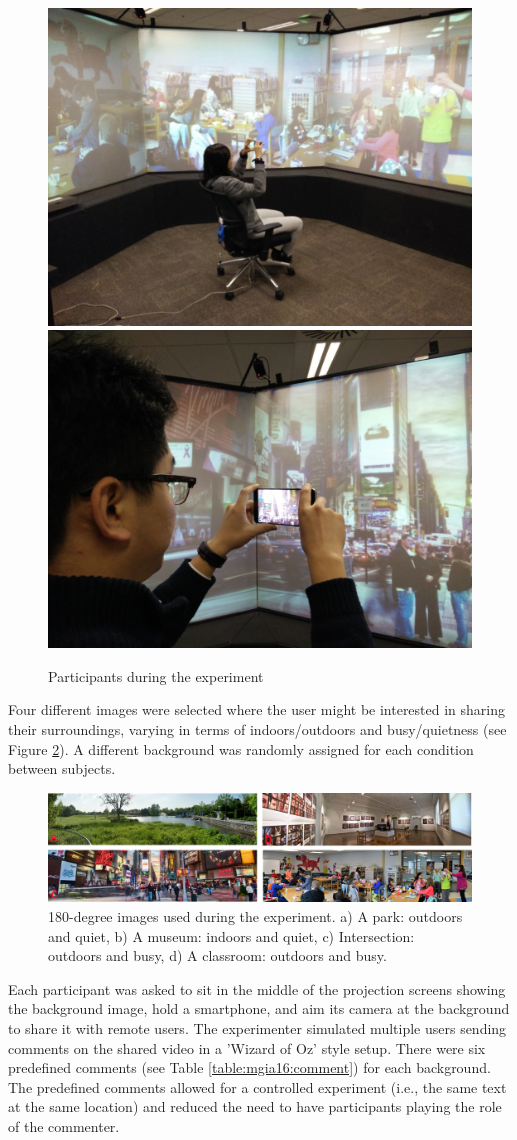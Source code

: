 \begin{figure}[h]
  \centering
  \includegraphics[width=0.45\linewidth]{images/mgia16/participant1}
  \includegraphics[width=0.45\linewidth]{images/mgia16/participant2}
  \caption{Participants during the experiment}
    \label{fig:mgia16:participant}
\end{figure}

Four different images were selected where the user might be interested in sharing their surroundings, varying in terms of indoors/outdoors and busy/quietness (see Figure \ref{fig:mgia16:backgrounds}). A different background was randomly assigned for each condition between subjects. 

\begin{figure}[h]
  \centering
  \includegraphics[width=\linewidth]{images/mgia16/backgrounds-legend.png}
  \caption{180-degree images used during the experiment. a) A park: outdoors and quiet, b) A museum: indoors and quiet, c) Intersection: outdoors and busy, d) A classroom: outdoors and busy.}
    \label{fig:mgia16:backgrounds}
\end{figure}

Each participant was asked to sit in the middle of the projection screens showing the background image, hold a smartphone, and aim its camera at the background to share it with remote users. The experimenter simulated multiple users sending comments on the shared video in a 'Wizard of Oz' style setup. There were six predefined comments (see Table \ref{table:mgia16:comment}) for each background. The predefined comments allowed for a controlled experiment (i.e., the same text at the same location) and reduced the need to have participants playing the role of the commenter. 

